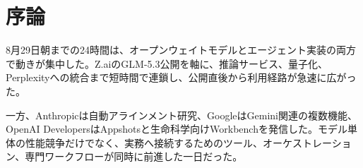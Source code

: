 \section*{序論}
8月29日朝までの24時間は、オープンウェイトモデルとエージェント実装の両方で動きが集中した。Z.aiのGLM-5.3公開を軸に、推論サービス、量子化、Perplexityへの統合まで短時間で連鎖し、公開直後から利用経路が急速に広がった。

一方、Anthropicは自動アラインメント研究、GoogleはGemini関連の複数機能、OpenAI DevelopersはAppshotsと生命科学向けWorkbenchを発信した。モデル単体の性能競争だけでなく、実務へ接続するためのツール、オーケストレーション、専門ワークフローが同時に前進した一日だった。
